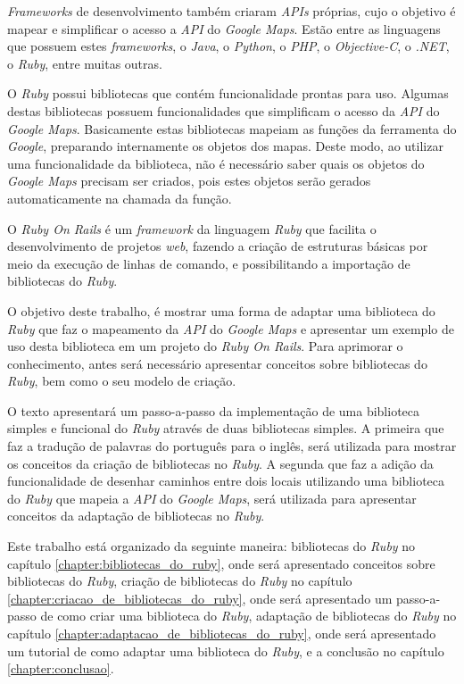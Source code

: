 \emph{Frameworks} de desenvolvimento também criaram \emph{APIs} próprias, cujo o objetivo é mapear
e simplificar o acesso a \emph{API} do \emph{Google Maps}. Estão entre as linguagens que possuem
estes \emph{frameworks}, o \emph{Java}, o \emph{Python}, o \emph{PHP}, o \emph{Objective-C},
o \emph{.NET}, o \emph{Ruby}, entre muitas outras.

O \emph{Ruby} possui bibliotecas que contém funcionalidade prontas para uso. Algumas destas
bibliotecas possuem funcionalidades que simplificam o acesso da \emph{API} do \emph{Google Maps}.
Basicamente estas bibliotecas mapeiam as funções da ferramenta do \emph{Google}, preparando
internamente os objetos dos mapas. Deste modo, ao utilizar uma funcionalidade da biblioteca, não
é necessário saber quais os objetos do \emph{Google Maps} precisam ser criados, pois estes
objetos serão gerados automaticamente na chamada da função.

O \emph{Ruby On Rails} é um \emph{framework} da linguagem \emph{Ruby} que facilita o
desenvolvimento de projetos \emph{web}, fazendo a criação de estruturas básicas por meio da
execução de linhas de comando, e possibilitando a importação de bibliotecas do \emph{Ruby}.

O objetivo deste trabalho, é mostrar uma forma de adaptar uma biblioteca do \emph{Ruby}
que faz o mapeamento da \emph{API} do \emph{Google Maps} e apresentar um exemplo de uso desta
biblioteca em um projeto do \emph{Ruby On Rails}. Para aprimorar o conhecimento, antes será
necessário apresentar conceitos sobre bibliotecas do \emph{Ruby}, bem como o seu modelo de
criação.

O texto apresentará um passo-a-passo da implementação de uma biblioteca simples
e funcional do \emph{Ruby} através de duas bibliotecas simples. A primeira que faz a
tradução de palavras do português para o inglês, será utilizada para mostrar os
conceitos da criação de bibliotecas no \emph{Ruby}. A segunda que faz a adição da
funcionalidade de desenhar caminhos entre dois locais utilizando uma biblioteca do
\emph{Ruby} que mapeia a \emph{API} do \emph{Google Maps}, será utilizada para apresentar
conceitos da adaptação de bibliotecas no \emph{Ruby}.

Este trabalho está organizado da seguinte maneira: bibliotecas do \emph{Ruby} no
capítulo \ref{chapter:bibliotecas_do_ruby}, onde será apresentado conceitos sobre
bibliotecas do \emph{Ruby}, criação de bibliotecas do \emph{Ruby} no capítulo
\ref{chapter:criacao_de_bibliotecas_do_ruby}, onde será apresentado um passo-a-passo
de como criar uma biblioteca do \emph{Ruby}, adaptação de bibliotecas do \emph{Ruby}
no capítulo  \ref{chapter:adaptacao_de_bibliotecas_do_ruby}, onde será apresentado um
tutorial de como adaptar uma biblioteca do \emph{Ruby}, e a conclusão no capítulo
\ref{chapter:conclusao}.
